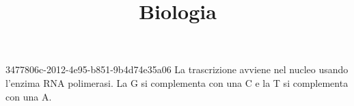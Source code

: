 \documentclass[preview]{standalone}
\begin{document}
\title{Biologia}
\genpage

\begin{snippet}{3477806c-2012-4e95-b851-9b4d74e35a06}
    La trascrizione avviene nel nucleo usando l'enzima RNA polimerasi.
    La G si complementa con una C e la T si complementa con una A.
\end{snippet}
\end{document}
